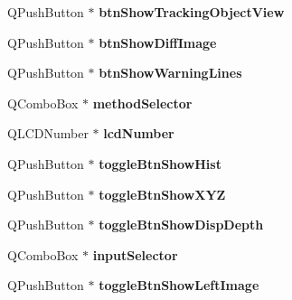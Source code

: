 \begin{DoxyCompactItemize}
\item 
Q\+Push\+Button $\ast$ {\bfseries btn\+Show\+Tracking\+Object\+View}\hypertarget{class_ui___main_window_a5826d8e6447af41ca3ed383217141e05}{}\label{class_ui___main_window_a5826d8e6447af41ca3ed383217141e05}

\item 
Q\+Push\+Button $\ast$ {\bfseries btn\+Show\+Diff\+Image}\hypertarget{class_ui___main_window_a0d0325ec82050a9de5d10d14f1589ad2}{}\label{class_ui___main_window_a0d0325ec82050a9de5d10d14f1589ad2}

\item 
Q\+Push\+Button $\ast$ {\bfseries btn\+Show\+Warning\+Lines}\hypertarget{class_ui___main_window_ad71edbfb8100c5bc2bc28ab926a4d426}{}\label{class_ui___main_window_ad71edbfb8100c5bc2bc28ab926a4d426}

\item 
Q\+Combo\+Box $\ast$ {\bfseries method\+Selector}\hypertarget{class_ui___main_window_a7dc757283ef86dae9c569ff9b309471d}{}\label{class_ui___main_window_a7dc757283ef86dae9c569ff9b309471d}

\item 
Q\+L\+C\+D\+Number $\ast$ {\bfseries lcd\+Number}\hypertarget{class_ui___main_window_aeaa664b636e02543a3047acb6d8918c5}{}\label{class_ui___main_window_aeaa664b636e02543a3047acb6d8918c5}

\item 
Q\+Push\+Button $\ast$ {\bfseries toggle\+Btn\+Show\+Hist}\hypertarget{class_ui___main_window_a21d86f2c5c275540e88c7389cae49de3}{}\label{class_ui___main_window_a21d86f2c5c275540e88c7389cae49de3}

\item 
Q\+Push\+Button $\ast$ {\bfseries toggle\+Btn\+Show\+X\+YZ}\hypertarget{class_ui___main_window_a88a4b46d267cadbaa69a3934abdbca88}{}\label{class_ui___main_window_a88a4b46d267cadbaa69a3934abdbca88}

\item 
Q\+Push\+Button $\ast$ {\bfseries toggle\+Btn\+Show\+Disp\+Depth}\hypertarget{class_ui___main_window_a858c2f497438654ce1613a9bf2505cc6}{}\label{class_ui___main_window_a858c2f497438654ce1613a9bf2505cc6}

\item 
Q\+Combo\+Box $\ast$ {\bfseries input\+Selector}\hypertarget{class_ui___main_window_aac393ae8df4601334b50ebf65d67ef9d}{}\label{class_ui___main_window_aac393ae8df4601334b50ebf65d67ef9d}

\item 
Q\+Push\+Button $\ast$ {\bfseries toggle\+Btn\+Show\+Left\+Image}\hypertarget{class_ui___main_window_ab46a543a56d143443d424cb611d205fd}{}\label{class_ui___main_window_ab46a543a56d143443d424cb611d205fd}


\end{DoxyCompactItemize}
